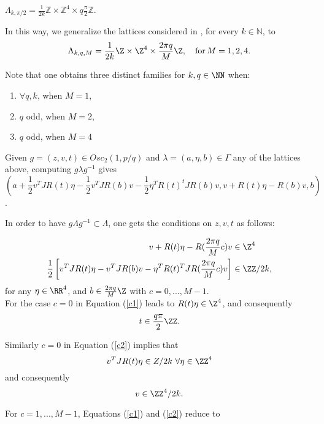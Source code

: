 \documentclass[12pt]{amsart}
\theoremstyle{plain}
\theoremstyle{definition}
\theoremstyle{remark}
\begin{document}
  $\Lambda_{k,\pi/2}=\frac1{2k} \mathbb Z\times \mathbb Z^4 \times q\frac{\pi}2 \mathbb Z$.
  
  In this way, we generalize the lattices considered in \cite{BOV}, for every $k\in \mathbb N$, to 
  $$\Lambda_{k,q,M} = \frac{1}{2 k} \Z \times \Z^4 \times \frac{2 \pi q}{M} \Z, \quad \mbox{for} \, M=1,2,4.$$

 Note that one obtains three distinct families for $k, q \in \NN$  when:
 \begin{enumerate}
     \item $\forall q, k$, when $M=1$,
     \item $q$ odd, when $M=2$,
     \item $q$ odd,  when $M=4$
 \end{enumerate}
 

Given $g=(z,v,t) \in Osc_2(1,p/q)$ and $\lambda=(a,\eta,b) \in \Gamma$ any of the lattices above, computing $g \lambda g^{-1}$ gives
\begin{equation}
    (a + \frac{1}{2}v^T J R(t) \eta - \frac{1}{2} v^T J R(b) v - \frac{1}{2} \eta^T R(t)^t J R(b) v, v + R(t) \eta - R(b) v, b)
\end{equation}.

In order to have $g \Lambda g^{-1} \subset \Lambda$, one gets the conditions on $z,v,t$ as follows:

\begin{align}
    v + R(t) \eta - R(\frac{2 \pi q}{M} c)v &\in \Z^4   \label{c1} \\ 
    \frac{1}{2} \left[ v^T J R(t) \eta - v^T J R(b) v - \eta^T R(t)^TJR(\frac{2 \pi q}{M} c) v \right] &\in \ZZ/{2k}, \label{c2}
\end{align}
 for any $ \eta \in \RR^4$, and $ b \in \frac{2 \pi q}{M} \Z$ with $c = 0, ..., M-1$. \\

For the case $c=0$ in Equation (\ref{c1}) leads to $R(t) \eta \in \Z^4$, and consequently 
\begin{equation}
t \in \frac{q \pi}{2} \ZZ. \label{cc1}
\end{equation}

Similarly $c=0$ in Equation (\ref{c2}) implies that $$ v^T J R(t) \eta \in Z / {2 k} \,\, \forall \eta \in \ZZ^4 $$     
and consequently 
\begin{equation}
    v \in \ZZ^4/{2k}. \label{cc2}
\end{equation}

For $c = 1, ..., M-1$, Equations (\ref{c1}) and (\ref{c2}) reduce to
\end{document}
